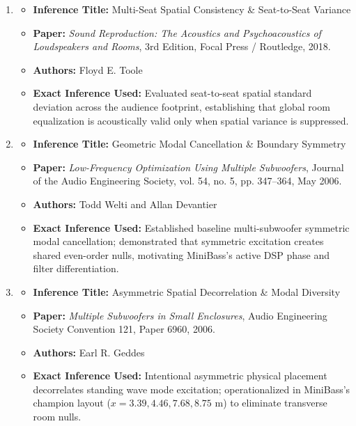 \documentclass[11pt,a4paper]{article}
\begin{document}
\begin{enumerate}
    \item 
    \begin{itemize}
        \item \textbf{Inference Title:} Multi-Seat Spatial Consistency \& Seat-to-Seat Variance
        \item \textbf{Paper:} \textit{Sound Reproduction: The Acoustics and Psychoacoustics of Loudspeakers and Rooms}, 3rd Edition, Focal Press / Routledge, 2018.
        \item \textbf{Authors:} Floyd E. Toole
        \item \textbf{Exact Inference Used:} Evaluated seat-to-seat spatial standard deviation across the audience footprint, establishing that global room equalization is acoustically valid only when spatial variance is suppressed.
    \end{itemize}

    \item 
    \begin{itemize}
        \item \textbf{Inference Title:} Geometric Modal Cancellation \& Boundary Symmetry
        \item \textbf{Paper:} \textit{Low-Frequency Optimization Using Multiple Subwoofers}, Journal of the Audio Engineering Society, vol. 54, no. 5, pp. 347--364, May 2006.
        \item \textbf{Authors:} Todd Welti and Allan Devantier
        \item \textbf{Exact Inference Used:} Established baseline multi-subwoofer symmetric modal cancellation; demonstrated that symmetric excitation creates shared even-order nulls, motivating MiniBass's active DSP phase and filter differentiation.
    \end{itemize}

    \item 
    \begin{itemize}
        \item \textbf{Inference Title:} Asymmetric Spatial Decorrelation \& Modal Diversity
        \item \textbf{Paper:} \textit{Multiple Subwoofers in Small Enclosures}, Audio Engineering Society Convention 121, Paper 6960, 2006.
        \item \textbf{Authors:} Earl R. Geddes
        \item \textbf{Exact Inference Used:} Intentional asymmetric physical placement decorrelates standing wave mode excitation; operationalized in MiniBass's champion layout ($x = 3.39, 4.46, 7.68, 8.75\text{ m}$) to eliminate transverse room nulls.
    \end{itemize}


\end{enumerate}
\end{document}
